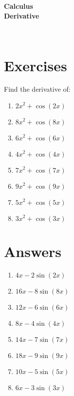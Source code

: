 

\begin{centering}
\bf{ \Large  Calculus \\
Derivative \\
}
\end{centering}
\ 
\section{Exercises}
Find the derivative of:
\begin{enumerate}
    \item $2 x^{2} + \cos{\left(2 x \right)}$  \item $8 x^{2} + \cos{\left(8 x \right)}$  \item $6 x^{2} + \cos{\left(6 x \right)}$  \item $4 x^{2} + \cos{\left(4 x \right)}$  \item $7 x^{2} + \cos{\left(7 x \right)}$  \item $9 x^{2} + \cos{\left(9 x \right)}$  \item $5 x^{2} + \cos{\left(5 x \right)}$  \item $3 x^{2} + \cos{\left(3 x \right)}$
\end{enumerate}
\section{Answers}
\begin{enumerate}
    \item $4 x - 2 \sin{\left(2 x \right)}$  \item $16 x - 8 \sin{\left(8 x \right)}$  \item $12 x - 6 \sin{\left(6 x \right)}$  \item $8 x - 4 \sin{\left(4 x \right)}$  \item $14 x - 7 \sin{\left(7 x \right)}$  \item $18 x - 9 \sin{\left(9 x \right)}$  \item $10 x - 5 \sin{\left(5 x \right)}$  \item $6 x - 3 \sin{\left(3 x \right)}$
\end{enumerate}






